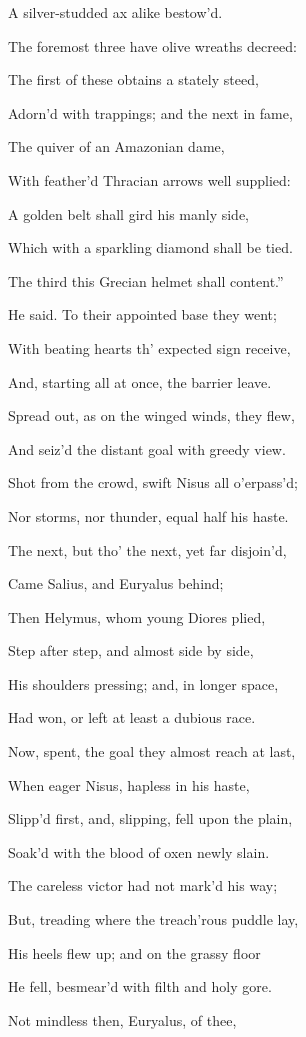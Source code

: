 A silver-studded ax alike bestow’d.

The foremost three have olive wreaths decreed:

The first of these obtains a stately steed,

Adorn’d with trappings; and the next in fame,

The quiver of an Amazonian dame,

With feather’d Thracian arrows well supplied:

A golden belt shall gird his manly side,

Which with a sparkling diamond shall be tied.

The third this Grecian helmet shall content.”

He said. To their appointed base they went;

With beating hearts th’ expected sign receive,

And, starting all at once, the barrier leave.

Spread out, as on the winged winds, they flew,

And seiz’d the distant goal with greedy view.

Shot from the crowd, swift Nisus all o’erpass’d;

Nor storms, nor thunder, equal half his haste.

The next, but tho’ the next, yet far disjoin’d,

Came Salius, and Euryalus behind;

Then Helymus, whom young Diores plied,

Step after step, and almost side by side,

His shoulders pressing; and, in longer space,

Had won, or left at least a dubious race.

Now, spent, the goal they almost reach at last,

When eager Nisus, hapless in his haste,

Slipp’d first, and, slipping, fell upon the plain,

Soak’d with the blood of oxen newly slain.

The careless victor had not mark’d his way;

But, treading where the treach’rous puddle lay,

His heels flew up; and on the grassy floor

He fell, besmear’d with filth and holy gore.

Not mindless then, Euryalus, of thee,

